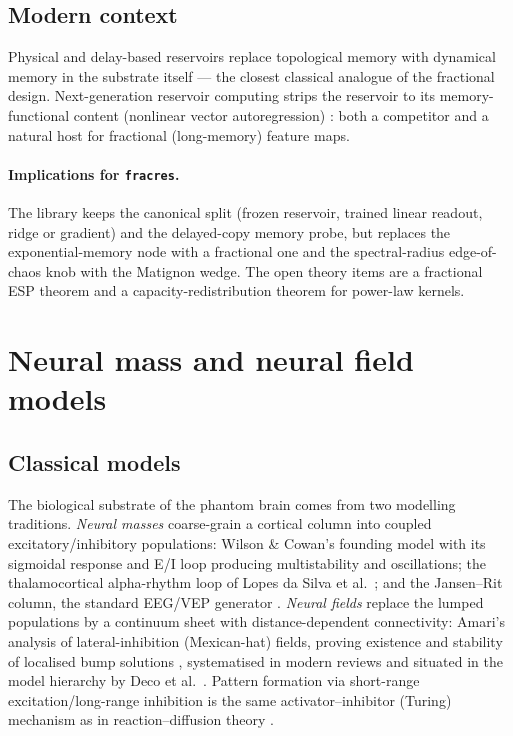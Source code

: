 \documentclass[11pt,a4paper]{article}
\begin{document}
\subsection{Modern context}

Physical and delay-based reservoirs replace topological memory with dynamical
memory in the substrate itself \cite{tanaka2019review,nakajima2021book} ---
the closest classical analogue of the fractional design. Next-generation
reservoir computing strips the reservoir to its memory-functional content
(nonlinear vector autoregression) \cite{gauthier2021nextgen}: both a
competitor and a natural host for fractional (long-memory) feature maps.

\paragraph{Implications for \texttt{fracres}.}
The library keeps the canonical split (frozen reservoir, trained linear
readout, ridge or gradient) and the delayed-copy memory probe, but replaces
the exponential-memory node with a fractional one and the spectral-radius
edge-of-chaos knob with the Matignon wedge. The open theory items are a
fractional ESP theorem and a capacity-redistribution theorem for power-law
kernels.

\section{Neural mass and neural field models}
\label{sec:masses}

\subsection{Classical models}

The biological substrate of the phantom brain comes from two modelling
traditions. \emph{Neural masses} coarse-grain a cortical column into coupled
excitatory/inhibitory populations: Wilson \& Cowan's founding model
\cite{wilson1972excitatory,wilson1973mathematical} with its sigmoidal
response and E/I loop producing multistability and oscillations; the
thalamocortical alpha-rhythm loop of Lopes da Silva et al.\
\cite{lopesdasilva1974model}; and the Jansen--Rit column, the standard
EEG/VEP generator \cite{jansen1995electroencephalogram}. \emph{Neural fields}
replace the lumped populations by a continuum sheet with distance-dependent
connectivity: Amari's analysis of lateral-inhibition (Mexican-hat) fields,
proving existence and stability of localised bump solutions
\cite{amari1977dynamics}, systematised in modern reviews
\cite{coombes2005waves,coombes2010large,ermentrout1998neural} and situated in
the model hierarchy by Deco et al.\ \cite{deco2008dynamic}. Pattern formation
via short-range excitation/long-range inhibition is the same
activator--inhibitor (Turing) mechanism as in reaction--diffusion theory
\cite{murray2002mathematical}.
\end{document}

